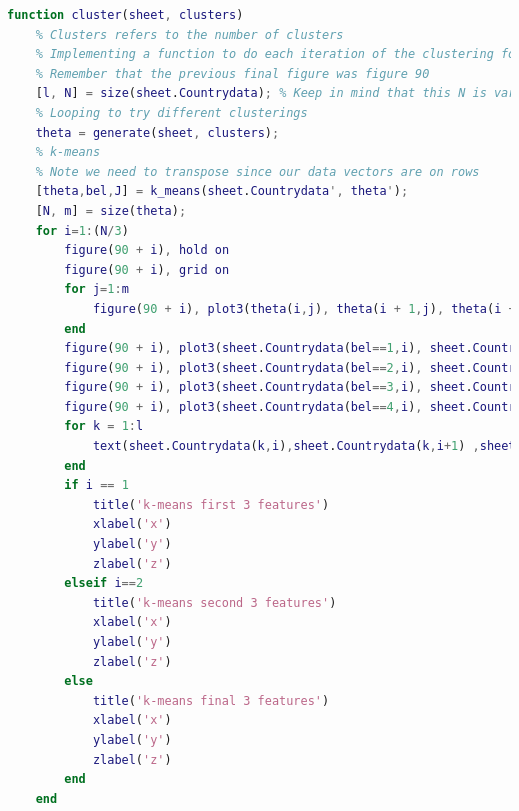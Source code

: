 \documentclass[12pt, a4paper]{article}
\begin{document}
\begin{lstlisting}[language=Matlab, label=lst:final, caption=The entire code as it was upon completion.]
function cluster(sheet, clusters)
    % Clusters refers to the number of clusters
    % Implementing a function to do each iteration of the clustering for each alrgorithm so that the iterations throught the data is simple
    % Remember that the previous final figure was figure 90
    [l, N] = size(sheet.Countrydata); % Keep in mind that this N is variable
    % Looping to try different clusterings
    theta = generate(sheet, clusters);
    % k-means
    % Note we need to transpose since our data vectors are on rows
    [theta,bel,J] = k_means(sheet.Countrydata', theta');
    [N, m] = size(theta);
    for i=1:(N/3)
        figure(90 + i), hold on
        figure(90 + i), grid on
        for j=1:m
            figure(90 + i), plot3(theta(i,j), theta(i + 1,j), theta(i + 2,j), 'k+')
        end
        figure(90 + i), plot3(sheet.Countrydata(bel==1,i), sheet.Countrydata(bel==1, i+ 1), sheet.Countrydata(bel==1,i+2), 'ro')
        figure(90 + i), plot3(sheet.Countrydata(bel==2,i), sheet.Countrydata(bel==2, i+ 1), sheet.Countrydata(bel==2,i+2), 'g*')
        figure(90 + i), plot3(sheet.Countrydata(bel==3,i), sheet.Countrydata(bel==3, i+ 1), sheet.Countrydata(bel==3,i+2), 'b.')
        figure(90 + i), plot3(sheet.Countrydata(bel==4,i), sheet.Countrydata(bel==4, i+ 1), sheet.Countrydata(bel==4,i+2), 'ys')
        for k = 1:l
            text(sheet.Countrydata(k,i),sheet.Countrydata(k,i+1) ,sheet.Countrydata(k,i+2) , sheet.country(k), 'FontSize', 8, 'HorizontalAlignment', 'left')
        end
        if i == 1
            title('k-means first 3 features')
            xlabel('x')
            ylabel('y')
            zlabel('z')
        elseif i==2
            title('k-means second 3 features')
            xlabel('x')
            ylabel('y')
            zlabel('z')
        else
            title('k-means final 3 features')
            xlabel('x')
            ylabel('y')
            zlabel('z')
        end
    end


\end{lstlisting}
\end{document}
